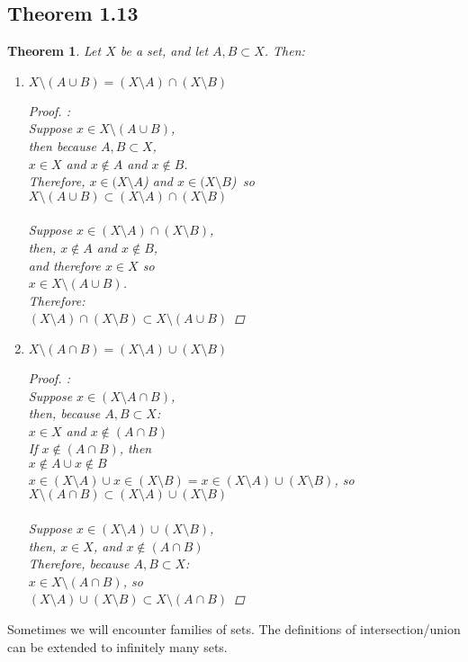 \documentclass[openany, amssymb, psamsfonts]{amsart}
\newtheorem{thm}{Theorem}[section]
\theoremstyle{definition}
\numberwithin{equation}{section}
\begin{document}
\subsection{Theorem 1.13}

\begin{thm} 
Let $X$ be a set, and let $A, B\subset X$.  Then:
\begin{enumerate}
\item[a)]
$X\setminus (A\cup B)=(X\setminus A)\cap (X\setminus B)$
\begin{proof}:\\
Suppose $x\in X\setminus (A\cup B)$,\\
then because $A,B \subset X$,\\
$x\in X$ and $x\notin A$ and $x\notin B$.\\
Therefore, $x\in (X\setminus A$) and $x\in (X\setminus B$)\, so \\
$X\setminus (A\cup B)\subset (X\setminus A)\cap (X\setminus B)$\\\\
Suppose $x\in (X\setminus A)\cap (X\setminus B)$,\\
then, $x\notin A$ and $x\notin B$,\\
and therefore $x\in X$ so\\
$x\in X\setminus (A \cup B)$. \\
Therefore:\\
$(X\setminus A)\cap (X\setminus B)\subset X\setminus (A\cup B)$
\end{proof}






\item[b)]
$X\setminus (A\cap B)=(X\setminus A)\cup (X\setminus B)$

\begin{proof}:\\
Suppose $x \in (X\setminus A\cap B)$,\\
then, because $A,B \subset X$:\\
$x\in X$ and $x\notin (A \cap B)$\\
If $x\notin (A \cap B)$, then \\
$x\notin A \cup x\notin B$\\
$x\in (X\setminus A) \cup x\in (X\setminus B)= x\in (X\setminus A)\cup (X\setminus B)$, so \\
$X\setminus (A\cap B)\subset (X\setminus A)\cup (X\setminus B)$\\\\
Suppose $x\in (X\setminus A)\cup (X\setminus B)$, \\
then, $x\in X$, and $x \notin (A\cap B)$\\
Therefore, because $A,B \subset X$:\\
$x\in X \setminus (A\cap B)$, so\\
$(X\setminus A)\cup (X\setminus B) \subset X\setminus (A\cap B)$

\end{proof}
\end{enumerate}
\end{thm}
Sometimes we will encounter families of sets. The definitions of intersection/union can be extended to infinitely many sets. 
\end{document}
